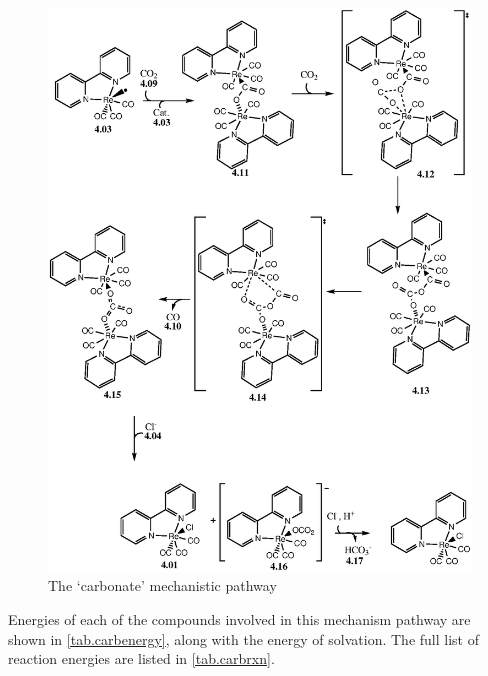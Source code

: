 \begin{figure}[!ht]
 \begin{center}
  \includegraphics[clip=true, width=140mm, keepaspectratio]{images/carbonate.eps}
 \end{center}
\caption{The `carbonate' mechanistic pathway}
\label{fig.carbonate}
\end{figure} 

Energies of each of the compounds involved in this mechanism pathway are shown in \autoref{tab.carbenergy}, along with the energy of solvation. The full list of reaction energies are listed in \autoref{tab.carbrxn}.





